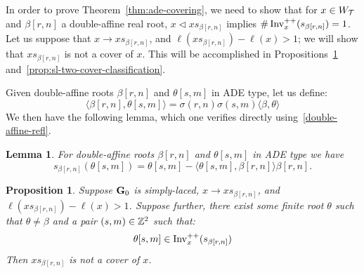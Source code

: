 \documentclass[10pt]{amsart}
\newtheorem{prop}[theo]{Proposition}
\newtheorem{lemm}[theo]{Lemma}
\begin{document}
In order to prove Theorem~\ref{thm:ade-covering}, we need to show that for $x \in W_{\mathcal{T}}$ and $\beta[r,n]$ a double-affine real root, $x \lhd x s_{\beta[r,n]}$ implies $\# \operatorname{Inv}^{++}_x(s_{\beta[r,n]}) = 1$. Let us suppose that $x \rightarrow x s_{\beta[r,n]}$, and $\ell(x s_{\beta[r,n]}) - \ell(x) > 1$; we will show that $x s_{\beta[r,n]}$ is not a cover of $x$. This will be accomplished in Propositions~\ref{prop:not-cover} and~\ref{prop:sl-two-cover-classification}.

Given double-affine roots $\beta[r,n]$ and $\theta[s,m]$ in ADE type, let us define:
\begin{equation}\label{eq:31}
\langle \beta[r,n], \theta[s,m] \rangle = \sigma(r,n)\sigma(s,m) \langle \beta, \theta \rangle
\end{equation}
We then have the following lemma, which one verifies directly using~\eqref{double-affine-refl}.
\begin{lemm}\label{lem:reflection-formula-with-pairing}
For double-affine roots $\beta[r,n]$ and $\theta[s,m]$ in ADE type we have
\begin{equation}\label{eq:32}
s_{\beta[r,n]}(\theta[s,m]) = \theta[s,m] - \langle \theta[s,m], \beta[r,n] \rangle \beta[r,n].
\end{equation}
\end{lemm}

\begin{prop}\label{prop:not-cover}
Suppose $\mathbf{G}_0$ is simply-laced, $x \rightarrow x s_{\beta[r,n]}$, and $\ell(x s_{\beta[r,n]}) - \ell(x) > 1$. Suppose further, there exist some finite root $\theta$ such that $\theta \neq \beta$ and a pair $(s,m) \in \mathbb{Z}^2$ such that:
\begin{equation}\label{eq:8}
\theta[s,m] \in \Invplusplusx(s_{\beta[r,n]})
\end{equation}
Then $x s_{\beta[r,n]}$ is not a cover of $x$.
\end{prop}
\end{document}
